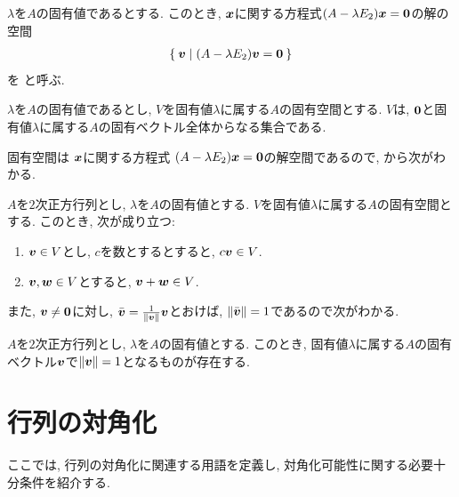 \begin{definition}
  $\lambda$を$A$の固有値であるとする.
  このとき,
  $\boldsymbol{x}$に関する方程式$(A-\lambda E_2)\boldsymbol{x}=\boldsymbol{0}$の解の空間
  \begin{align*}
    \Set{\boldsymbol{v}| (A-\lambda E_2)\boldsymbol{v}=\boldsymbol{0}}
  \end{align*}
  を
 と呼ぶ.
\end{definition}
\begin{remark}
  $\lambda$を$A$の固有値であるとし,
  $V$を固有値$\lambda$に属する$A$の固有空間とする.
  $V$は,
  $\boldsymbol{0}$と固有値$\lambda$に属する$A$の固有ベクトル全体からなる集合である.
\end{remark}
固有空間は
$\boldsymbol{x}$に関する方程式
$(A-\lambda E_2)\boldsymbol{x}=\boldsymbol{0}$の解空間であるので,
から次がわかる.
\begin{prop}
  $A$を$2$次正方行列とし,
  $\lambda$を$A$の固有値とする.
  $V$を固有値$\lambda$に属する$A$の固有空間とする.
  このとき, 次が成り立つ:
  \begin{enumerate}
  \item $\boldsymbol{v}\in V$とし, $c$を数とするとすると, $c\boldsymbol{v}\in V$.
  \item $\boldsymbol{v},\boldsymbol{w}\in V$とすると, $\boldsymbol{v}+\boldsymbol{w}\in V$.
  \end{enumerate}
\end{prop}
また, $\boldsymbol{v}\neq\boldsymbol{0}$に対し, $\bar{\boldsymbol{v}}=\frac{1}{\|\boldsymbol{v}\|}\boldsymbol{v}$とおけば,
$\|\bar{\boldsymbol{v}}\|=1$であるので次がわかる.
\begin{cor}
  $A$を$2$次正方行列とし,
  $\lambda$を$A$の固有値とする.
  このとき, 
  固有値$\lambda$に属する$A$の固有ベクトル$\boldsymbol{v}$で$\|\boldsymbol{v}\|=1$となるものが存在する.
\end{cor}



\section{行列の対角化}
ここでは,
行列の対角化に関連する用語を定義し,
対角化可能性に関する必要十分条件を紹介する.

